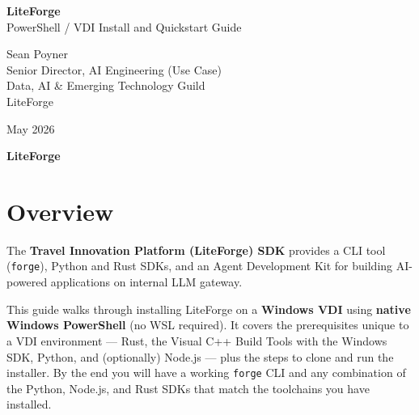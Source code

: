\documentclass[11pt,letterpaper]{article}
\begin{document}
\begin{titlepage}
\centering
\vspace*{2cm}

{\Huge\bfseries\color{navybg}LiteForge}\\[6pt]
{\Large\color{walterpurple}PowerShell / VDI Install and Quickstart Guide}

\vspace{1.5cm}


\vspace{1.5cm}

{\large Sean Poyner}\\[4pt]
{\normalsize\color{forgegray}Senior Director, AI Engineering (Use Case)}\\[4pt]
{\normalsize\color{forgegray}Data, AI \& Emerging Technology Guild}\\[12pt]
{\normalsize LiteForge}

\vspace{1.5cm}

{\normalsize May 2026}

\vfill

{\small\color{alertred}\textbf{LiteForge}}
\end{titlepage}

\tableofcontents
\newpage

\section{Overview}

The \textbf{Travel Innovation Platform (LiteForge) SDK} provides a CLI tool
(\texttt{forge}), Python and Rust SDKs, and an Agent Development Kit for
building AI-powered applications on internal LLM gateway.

This guide walks through installing LiteForge on a \textbf{Windows VDI}
using \textbf{native Windows PowerShell} (no WSL required). It covers the
prerequisites unique to a VDI environment --- Rust, the Visual C++ Build
Tools with the Windows SDK, Python, and (optionally) Node.js --- plus the
steps to clone and run the installer. By the end you will have a working
\texttt{forge} CLI and any combination of the Python, Node.js, and Rust SDKs
that match the toolchains you have installed.
\end{document}

